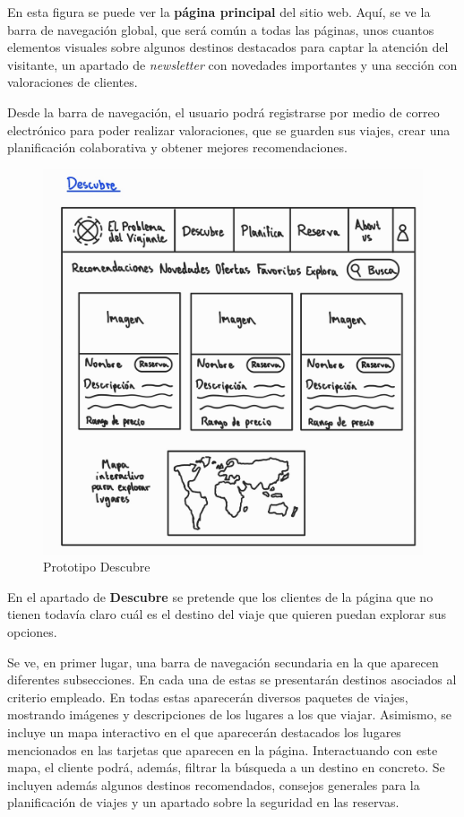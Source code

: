 \documentclass[11pt, a4paper]{book}
\begin{document}
	En esta figura se puede ver la \textbf{página principal} del sitio web. Aquí, se ve la barra de navegación global, que será común a todas las páginas, unos cuantos elementos visuales sobre algunos destinos destacados para captar la atención del visitante, un apartado de \textit{newsletter} con novedades importantes y una sección con valoraciones de clientes.
	
	Desde la barra de navegación, el usuario podrá registrarse por medio de correo electrónico para poder realizar valoraciones, que se guarden sus viajes, crear una planificación colaborativa y obtener mejores recomendaciones.
	
	\newpage
	
	\begin{figure} [H]
		\centering
		\includegraphics[width=\textwidth]{2-descubre.jpg}
		\caption{Prototipo Descubre}
	\end{figure} 

	En el apartado de \textbf{Descubre} se pretende que los clientes de la página que no tienen todavía claro cuál es el destino del viaje que quieren puedan explorar sus opciones. 
	
	Se ve, en primer lugar, una barra de navegación secundaria en la que aparecen diferentes subsecciones. En cada una de estas se presentarán destinos asociados al criterio empleado. En todas estas aparecerán diversos paquetes de viajes, mostrando imágenes y descripciones de los lugares a los que viajar. Asimismo, se incluye un mapa interactivo en el que aparecerán destacados los lugares mencionados en las tarjetas que aparecen en la página. Interactuando con este mapa, el cliente podrá, además, filtrar la búsqueda a un destino en concreto. Se incluyen además algunos destinos recomendados, consejos generales para la planificación de viajes y un apartado sobre la seguridad en las reservas.
\end{document}

